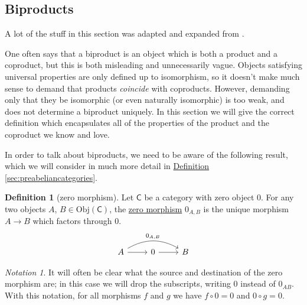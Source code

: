 \documentclass[a4paper,10pt]{scrreprt}
\newcommand{\defn}[1]{\ul{#1}}
\newcommand{\Obj}{\mathrm{Obj}}
\theoremstyle{definition}
\newtheorem{definition}{Definition}[section]
\theoremstyle{plain}
\theoremstyle{remark}
\newtheorem{notation}{Notation}[section]
\begin{document}
\subsection{Biproducts} \label{sec:biproducts}
A lot of the stuff in this section was adapted and expanded from \cite{annoying-precision-meditation}.

One often says that a biproduct is an object which is both a product and a coproduct, but this is both misleading and unnecessarily vague. Objects satisfying universal properties are only defined up to isomorphism, so it doesn't make much sense to demand that products \emph{coincide} with coproducts. However, demanding only that they be isomorphic (or even naturally isomorphic) is too weak, and does not determine a biproduct uniquely. In this section we will give the correct definition which encapsulates all of the properties of the product and the coproduct we know and love.

In order to talk about biproducts, we need to be aware of the following result, which we will consider in much more detail in \hyperref[sec:preabeliancategories]{Definition \ref*{sec:preabeliancategories}}.

\begin{definition}[zero morphism]
  Let $\mathsf{C}$ be a category with zero object $0$. For any two objects $A$, $B \in \Obj(\mathsf{C})$, the \defn{zero morphism} $0_{A,B}$ is the unique morphism $A \to B$ which factors through $0$.
  \begin{equation*}
    \begin{tikzcd}
      A
      \arrow[rr, bend left, "0_{A, B}"]
      \arrow[r]
      & 0
      \arrow[r]
      & B
    \end{tikzcd}
  \end{equation*}
\end{definition}

\begin{notation}
  It will often be clear what the source and destination of the zero morphism are; in this case we will drop the subscripts, writing $0$ instead of $0_{AB}$. With this notation, for all morphisms $f$ and $g$ we have $f \circ 0 = 0$ and $0 \circ g = 0$.
\end{notation}
\end{document}
